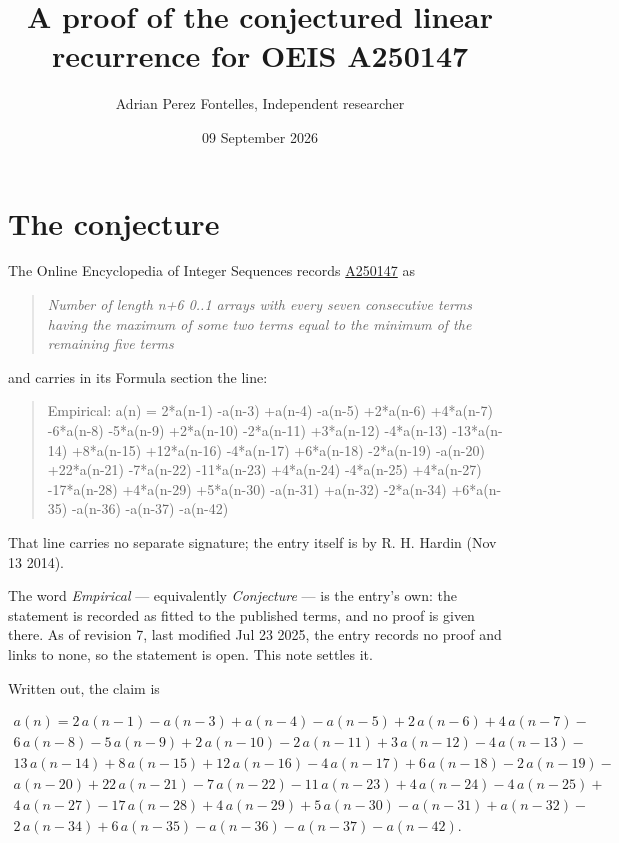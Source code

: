\documentclass[11pt]{article}
\title{A proof of the conjectured linear recurrence for OEIS A250147}
\author{Adrian Perez Fontelles, Independent researcher}
\date{09 September 2026}
\theoremstyle{definition}
\begin{document}
\maketitle
\section{The conjecture}

The Online Encyclopedia of Integer Sequences records \href{https://oeis.org/A250147}{A250147} as

\begin{quote}\itshape Number of length n+6 0..1 arrays with every seven consecutive terms having the maximum of some two terms equal to the minimum of the remaining five terms\end{quote}

and carries in its Formula section the line:

\begin{quote}\ttfamily Empirical: a(n) = 2*a(n-1) -a(n-3) +a(n-4) -a(n-5) +2*a(n-6) +4*a(n-7) -6*a(n-8) -5*a(n-9) +2*a(n-10) -2*a(n-11) +3*a(n-12) -4*a(n-13) -13*a(n-14) +8*a(n-15) +12*a(n-16) -4*a(n-17) +6*a(n-18) -2*a(n-19) -a(n-20) +22*a(n-21) -7*a(n-22) -11*a(n-23) +4*a(n-24) -4*a(n-25) +4*a(n-27) -17*a(n-28) +4*a(n-29) +5*a(n-30) -a(n-31) +a(n-32) -2*a(n-34) +6*a(n-35) -a(n-36) -a(n-37) -a(n-42)\end{quote}

That line carries no separate signature; the entry itself is by R. H. Hardin (Nov 13 2014).

The word {\itshape Empirical} --- equivalently {\itshape Conjecture} --- is the entry's own: the statement is recorded as fitted to the published terms, and no proof is given there. As of revision 7, last modified Jul 23 2025, the entry records no proof and links to none, so the statement is open. This note settles it.

Written out, the claim is

\begin{multline*} a(n) = 2\,a(n-1) - a(n-3) + a(n-4) - a(n-5) + 2\,a(n-6) + 4\,a(n-7) - \\ 6\,a(n-8) - 5\,a(n-9) + 2\,a(n-10) - 2\,a(n-11) + 3\,a(n-12) - 4\,a(n-13) - \\ 13\,a(n-14) + 8\,a(n-15) + 12\,a(n-16) - 4\,a(n-17) + 6\,a(n-18) - 2\,a(n-19) - \\ a(n-20) + 22\,a(n-21) - 7\,a(n-22) - 11\,a(n-23) + 4\,a(n-24) - 4\,a(n-25) + \\ 4\,a(n-27) - 17\,a(n-28) + 4\,a(n-29) + 5\,a(n-30) - a(n-31) + a(n-32) - \\ 2\,a(n-34) + 6\,a(n-35) - a(n-36) - a(n-37) - a(n-42). \end{multline*}
\end{document}
